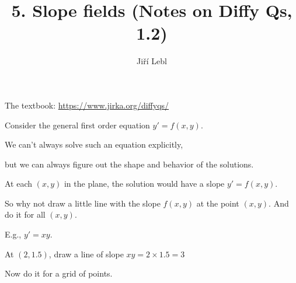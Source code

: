 \documentclass[10pt,aspectratio=169]{beamer}
\author{Ji\v{r}\'i Lebl}
\institute[OSU]{%
Oklahoma State University%
}
\title{5. Slope fields (Notes on Diffy Qs, 1.2)}
\date{}
\begin{document}
\begin{frame}
\titlepage


\begin{center}
The textbook: \url{https://www.jirka.org/diffyqs/}
\end{center}
\end{frame}

\begin{frame}
Consider the general first order equation \quad $y' = f(x,y)$.

\medskip
\pause

We can't always solve such an equation explicitly,

\pause
but we can always figure out the shape and behavior of the solutions.

\medskip
\pause

At each $(x,y)$ in the plane, the solution would have a slope $y' = f(x,y)$.

\medskip
\pause

So why not draw a little line with the slope $f(x,y)$ at the point $(x,y)$.
\pause
And do it for all $(x,y)$.

\pause
\medskip

E.g., $y'=xy$. \pause

At $(2,1.5)$, draw a line of slope
$xy = 2 \times 1.5 = 3$

\vspace*{-24pt}
\hspace*{3in}

\vspace*{-1.53in}
\pause
Now do it for a grid of points.

\vspace*{-42.5pt}
\hspace*{3in}


\end{frame}
\end{document}
